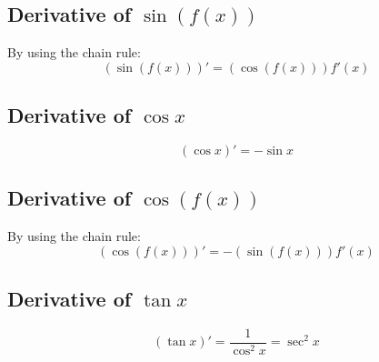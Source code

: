 \subsection{Derivative of $\sin\left(f(x)\right)$}
	By using the chain rule:
	\[\left( \sin\left( f(x) \right)\right)' = \left(\cos\left( f(x) \right)\right)f'(x)\]
\subsection{Derivative of $\cos x$}
	\[(\cos x)' = -\sin x\]
\subsection{Derivative of $\cos \left( f(x) \right)$}
	By using the chain rule:
	\[\left( \cos \left( f(x) \right) \right)' = -\left(\sin \left( f(x) \right) \right) f'(x)\]
\subsection{Derivative of $\tan x$}
	\[(\tan x)' = \frac{1}{\cos^2 x} = \sec^2 x\]
